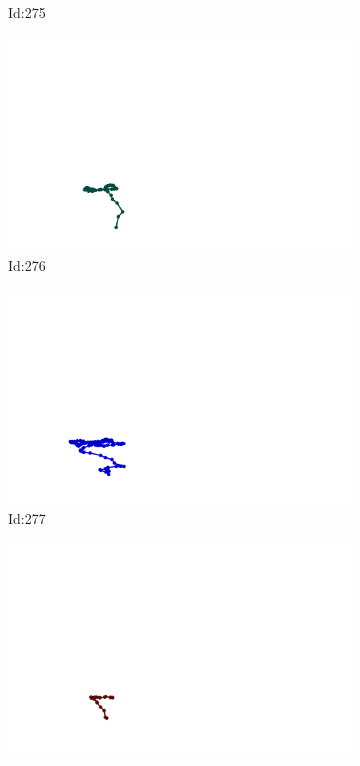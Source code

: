 \documentclass[12pt,twoside]{report}
\begin{document}
\begin{figure}
\begin{subfigure}[b]{0.20\textwidth}
\caption{Id:275}
\end{subfigure}
\begin{subfigure}[b]{0.20\textwidth}
\centering
\includegraphics[width=\textwidth]{../trajectories/276.png}
\caption{Id:276}
\end{subfigure}
\begin{subfigure}[b]{0.20\textwidth}
\centering
\includegraphics[width=\textwidth]{../trajectories/277.png}
\caption{Id:277}
\end{subfigure}
\begin{subfigure}[b]{0.20\textwidth}
\centering
\includegraphics[width=\textwidth]{../trajectories/278.png}

\end{subfigure}
\end{figure}
\end{document}
